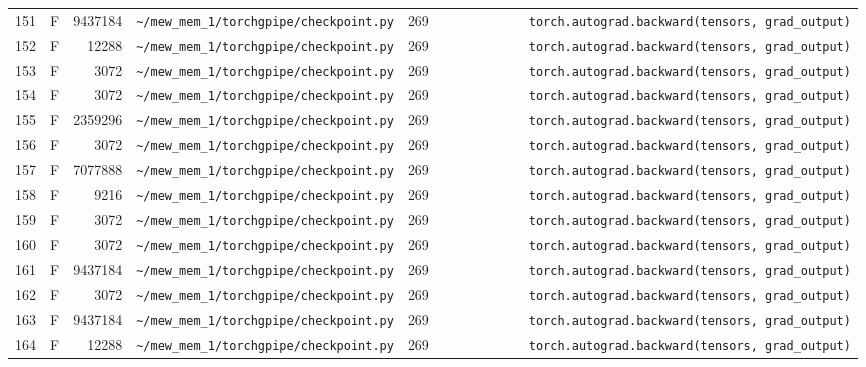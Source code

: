 \documentclass{article}
\begin{document}
\begin{longtable}{r l r p{6.5cm} r p{7.0cm}}
151 & F & 9437184 & \lstinline|~/mew_mem_1/torchgpipe/checkpoint.py| & 269 & \lstinline|            torch.autograd.backward(tensors, grad_output)| \\
152 & F & 12288 & \lstinline|~/mew_mem_1/torchgpipe/checkpoint.py| & 269 & \lstinline|            torch.autograd.backward(tensors, grad_output)| \\
153 & F & 3072 & \lstinline|~/mew_mem_1/torchgpipe/checkpoint.py| & 269 & \lstinline|            torch.autograd.backward(tensors, grad_output)| \\
154 & F & 3072 & \lstinline|~/mew_mem_1/torchgpipe/checkpoint.py| & 269 & \lstinline|            torch.autograd.backward(tensors, grad_output)| \\
155 & F & 2359296 & \lstinline|~/mew_mem_1/torchgpipe/checkpoint.py| & 269 & \lstinline|            torch.autograd.backward(tensors, grad_output)| \\
156 & F & 3072 & \lstinline|~/mew_mem_1/torchgpipe/checkpoint.py| & 269 & \lstinline|            torch.autograd.backward(tensors, grad_output)| \\
157 & F & 7077888 & \lstinline|~/mew_mem_1/torchgpipe/checkpoint.py| & 269 & \lstinline|            torch.autograd.backward(tensors, grad_output)| \\
158 & F & 9216 & \lstinline|~/mew_mem_1/torchgpipe/checkpoint.py| & 269 & \lstinline|            torch.autograd.backward(tensors, grad_output)| \\
159 & F & 3072 & \lstinline|~/mew_mem_1/torchgpipe/checkpoint.py| & 269 & \lstinline|            torch.autograd.backward(tensors, grad_output)| \\
160 & F & 3072 & \lstinline|~/mew_mem_1/torchgpipe/checkpoint.py| & 269 & \lstinline|            torch.autograd.backward(tensors, grad_output)| \\
161 & F & 9437184 & \lstinline|~/mew_mem_1/torchgpipe/checkpoint.py| & 269 & \lstinline|            torch.autograd.backward(tensors, grad_output)| \\
162 & F & 3072 & \lstinline|~/mew_mem_1/torchgpipe/checkpoint.py| & 269 & \lstinline|            torch.autograd.backward(tensors, grad_output)| \\
163 & F & 9437184 & \lstinline|~/mew_mem_1/torchgpipe/checkpoint.py| & 269 & \lstinline|            torch.autograd.backward(tensors, grad_output)| \\
164 & F & 12288 & \lstinline|~/mew_mem_1/torchgpipe/checkpoint.py| & 269 & \lstinline|            torch.autograd.backward(tensors, grad_output)| \\

\end{longtable}
\end{document}
